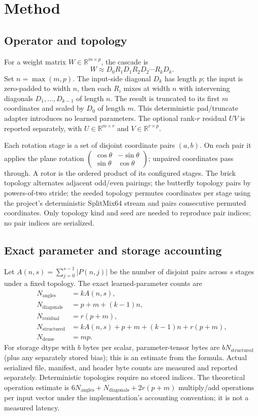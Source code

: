 \section{Method}
\label{sec:method}
\subsection{Operator and topology}
For a weight matrix $W\in\mathbb{R}^{m\times p}$, the cascade is
\[
W \approx D_0 R_1 D_1 R_2 D_2\cdots R_k D_k.
\]
Set $n=\max(m,p)$. The input-side diagonal $D_k$ has length $p$; the input is zero-padded to width $n$, then each $R_i$ mixes at width $n$ with intervening diagonals $D_1,\ldots,D_{k-1}$ of length $n$. The result is truncated to its first $m$ coordinates and scaled by $D_0$ of length $m$. This deterministic pad/truncate adapter introduces no learned parameters. The optional rank-$r$ residual $UV$ is reported separately, with $U\in\mathbb{R}^{m\times r}$ and $V\in\mathbb{R}^{r\times p}$.

Each rotation stage is a set of disjoint coordinate pairs $(a,b)$. On each pair it applies the plane rotation $\left(\begin{smallmatrix}\cos\theta&-\sin\theta\\\sin\theta&\cos\theta\end{smallmatrix}\right)$; unpaired coordinates pass through. A rotor is the ordered product of its configured stages. The brick topology alternates adjacent odd/even pairings; the butterfly topology pairs by powers-of-two stride; the seeded topology permutes coordinates per stage using the project's deterministic SplitMix64 stream and pairs consecutive permuted coordinates. Only topology kind and seed are needed to reproduce pair indices; no pair indices are serialized.

\subsection{Exact parameter and storage accounting}
Let $A(n,s)=\sum_{j=0}^{s-1}|P(n,j)|$ be the number of disjoint pairs across $s$ stages under a fixed topology. The exact learned-parameter counts are
\begin{align*}
N_{\mathrm{angles}} &= k A(n,s),\\
N_{\mathrm{diagonals}} &= p+m+(k-1)n,\\
N_{\mathrm{residual}} &= r(p+m),\\
N_{\mathrm{structured}} &= k A(n,s)+p+m+(k-1)n+r(p+m),\\
N_{\mathrm{dense}} &= mp.
\end{align*}
For storage dtype with $b$ bytes per scalar, parameter-tensor bytes are $bN_{\mathrm{structured}}$ (plus any separately stored bias); this is an estimate from the formula. Actual serialized file, manifest, and header byte counts are measured and reported separately. Deterministic topologies require no stored indices. The theoretical operation estimate is $6N_{\mathrm{angles}}+N_{\mathrm{diagonals}}+2r(p+m)$ multiply/add operations per input vector under the implementation's accounting convention; it is not a measured latency.

